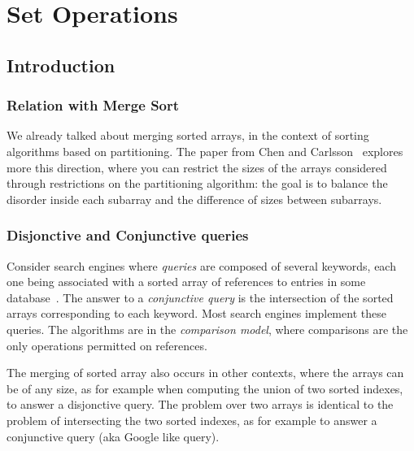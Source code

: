 
\chapter{Set Operations}
\label{cha:adaptive-union}


\section{Introduction}
\label{sec:introduction}


\subsection{Relation with Merge Sort}
\label{sec:relation-with-merge}

We already talked about merging sorted arrays, in the context of
sorting algorithms based on partitioning.
%
The paper from Chen and
Carlsson~\cite{onPartitionsAndPresortednessOfSequences} explores more
this direction, where you can restrict the sizes of the arrays
considered through restrictions on the partitioning algorithm: the
goal is to balance the disorder inside each subarray and the
difference of sizes between subarrays.

\subsection{Disjonctive and Conjunctive queries}
\label{sec:disj-conj-quer}


Consider search engines where {\em queries} are composed of several
keywords, each one being associated with a sorted array of references
to entries in some database~\cite[p.~136]{gigabytes}.
%
The answer to a {\em conjunctive query} is the intersection of
the sorted arrays corresponding to each keyword.
%
Most search engines implement these queries.
%
The algorithms are in the {\em comparison model}, where comparisons
are the only operations permitted on references.


The merging of sorted array also occurs in other contexts, where the
arrays can be of any size, as for example when computing the union of
two sorted indexes, to answer a disjonctive query.
%
The problem over two arrays is identical to the problem of
intersecting the two sorted indexes, as for example to answer a
conjunctive query (aka Google like query).

